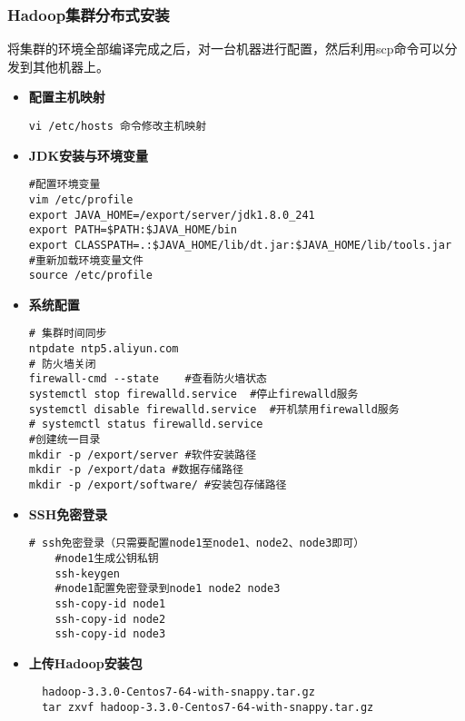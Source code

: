 \documentclass[bachelor]{thesis-uestc}
\begin{document}
\subsubsection{Hadoop集群分布式安装}
将集群的环境全部编译完成之后，对一台机器进行配置，然后利用scp命令可以分发到其他机器上。
\begin{itemize}
\item \textbf{配置主机映射}
\begin{verbatim}
vi /etc/hosts 命令修改主机映射
\end{verbatim}


\item \textbf{JDK安装与环境变量}
\begin{verbatim}
#配置环境变量
vim /etc/profile
export JAVA_HOME=/export/server/jdk1.8.0_241
export PATH=$PATH:$JAVA_HOME/bin
export CLASSPATH=.:$JAVA_HOME/lib/dt.jar:$JAVA_HOME/lib/tools.jar
#重新加载环境变量文件
source /etc/profile
\end{verbatim}

\item \textbf{系统配置}
\begin{verbatim}
# 集群时间同步
ntpdate ntp5.aliyun.com
# 防火墙关闭
firewall-cmd --state	#查看防火墙状态
systemctl stop firewalld.service  #停止firewalld服务
systemctl disable firewalld.service  #开机禁用firewalld服务
# systemctl status firewalld.service
#创建统一目录
mkdir -p /export/server #软件安装路径
mkdir -p /export/data #数据存储路径
mkdir -p /export/software/ #安装包存储路径
\end{verbatim}

\item \textbf{SSH免密登录}
\begin{verbatim}
# ssh免密登录（只需要配置node1至node1、node2、node3即可）
  	#node1生成公钥私钥
  	ssh-keygen  
  	#node1配置免密登录到node1 node2 node3
  	ssh-copy-id node1
  	ssh-copy-id node2
  	ssh-copy-id node3
\end{verbatim}

\item \textbf{上传Hadoop安装包}
\begin{verbatim}
  hadoop-3.3.0-Centos7-64-with-snappy.tar.gz
  tar zxvf hadoop-3.3.0-Centos7-64-with-snappy.tar.gz
\end{verbatim}


\end{itemize}
\end{document}
